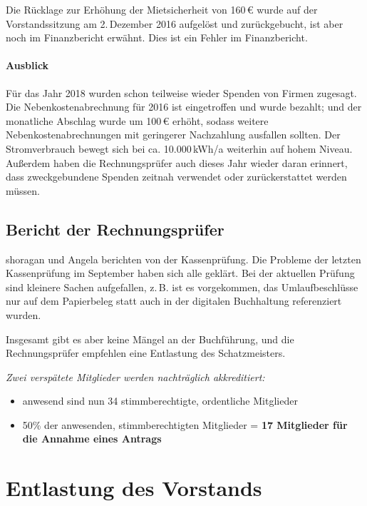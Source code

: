 \documentclass{s0minutes}
\begin{document}
Die Rücklage zur Erhöhung der Mietsicherheit von 160\,€ wurde auf der
Vorstandssitzung am 2.\,Dezember 2016 aufgelöst und zurückgebucht, ist aber noch
im Finanzbericht erwähnt. Dies ist ein Fehler im Finanzbericht.

\paragraph{Ausblick}
Für das Jahr 2018 wurden schon teilweise wieder Spenden von Firmen zugesagt. Die
Nebenkostenabrechnung für 2016 ist eingetroffen und wurde bezahlt; und der
monatliche Abschlag wurde um 100\,€ erhöht, sodass weitere
Nebenkostenabrechnungen mit geringerer Nachzahlung ausfallen sollten. Der
Stromverbrauch bewegt sich bei ca. 10{.}000\,kWh/a weiterhin auf hohem Niveau.
Außerdem haben die Rechnungsprüfer auch dieses Jahr wieder daran erinnert, dass
zweckgebundene Spenden zeitnah verwendet oder zurückerstattet werden müssen.

\subsection{Bericht der Rechnungsprüfer}

shoragan und Angela berichten von der Kassenprüfung. Die Probleme der letzten
Kassenprüfung im September haben sich alle geklärt. Bei der aktuellen Prüfung
sind kleinere Sachen aufgefallen, z.\,B. ist es vorgekommen, das Umlaufbeschlüsse
nur auf dem Papierbeleg statt auch in der digitalen Buchhaltung referenziert
wurden.

Insgesamt gibt es aber keine Mängel an der Buchführung, und die Rechnungsprüfer
empfehlen eine Entlastung des Schatzmeisters.

{ \itshape \vspace{\baselineskip}
  Zwei verspätete Mitglieder werden nachträglich akkreditiert:
  \begin{itemize}[nosep]
    \item anwesend sind nun 34 stimmberechtigte, ordentliche Mitglieder
    \item 50\% der anwesenden, stimmberechtigten Mitglieder =
      \textbf{17 Mitglieder für die Annahme eines Antrags}
  \end{itemize}
}

\section{Entlastung des Vorstands}
\end{document}
